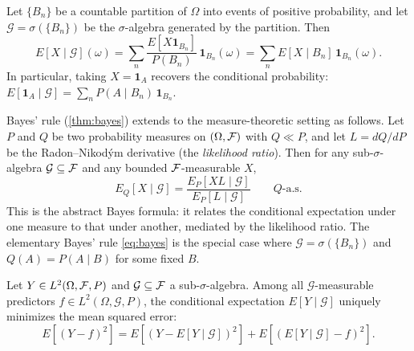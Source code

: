 \begin{example}\label{ex:cond-exp-partition}
Let $\{B_n\}$ be a countable partition of $\Omega$ into events of positive probability, and let $\mathcal{G} = \sigma(\{B_n\})$ be the $\sigma$-algebra generated by the partition. Then
\[
E[X \mid \mathcal{G}](\omega) = \sum_n \frac{E[X \mathbf{1}_{B_n}]}{P(B_n)}\, \mathbf{1}_{B_n}(\omega) = \sum_n E[X \mid B_n]\, \mathbf{1}_{B_n}(\omega).
\]
In particular, taking $X = \mathbf{1}_A$ recovers the conditional probability: $E[\mathbf{1}_A \mid \mathcal{G}] = \sum_n P(A \mid B_n)\, \mathbf{1}_{B_n}$.
\end{example}

\begin{remark}\label{rmk:bayes-measure}
Bayes' rule (\cref{thm:bayes}) extends to the measure-theoretic setting as follows. Let $P$ and $Q$ be two probability measures on $(\Omega, \mathcal{F})$ with $Q \ll P$, and let $L = dQ/dP$ be the Radon--Nikod\'ym derivative (the \emph{likelihood ratio}). Then for any sub-$\sigma$-algebra $\mathcal{G} \subseteq \mathcal{F}$ and any bounded $\mathcal{F}$-measurable $X$,
\begin{equation}\label{eq:abstract-bayes}
E_Q[X \mid \mathcal{G}] = \frac{E_P[XL \mid \mathcal{G}]}{E_P[L \mid \mathcal{G}]} \qquad Q\text{-a.s.}
\end{equation}
This is the abstract Bayes formula: it relates the conditional expectation under one measure to that under another, mediated by the likelihood ratio. The elementary Bayes' rule \eqref{eq:bayes} is the special case where $\mathcal{G} = \sigma(\{B_n\})$ and $Q(A) = P(A \mid B)$ for some fixed $B$.
\end{remark}

\begin{proposition}\label{prop:cond-exp-optimal}
Let $Y \in L^2(\Omega, \mathcal{F}, P)$ and $\mathcal{G} \subseteq \mathcal{F}$ a sub-$\sigma$-algebra. Among all $\mathcal{G}$-measurable predictors $f \in L^2(\Omega, \mathcal{G}, P)$, the conditional expectation $E[Y \mid \mathcal{G}]$ uniquely minimizes the mean squared error:
\begin{equation}\label{eq:mse-decomp}
E[(Y - f)^2] = E[(Y - E[Y \mid \mathcal{G}])^2] + E[(E[Y \mid \mathcal{G}] - f)^2].
\end{equation}
\end{proposition}

